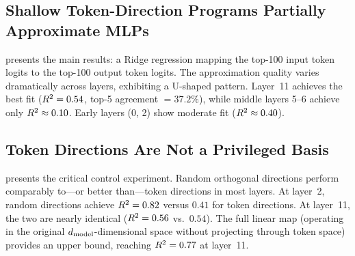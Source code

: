 \subsection{Shallow Token-Direction Programs Partially Approximate MLPs}
\label{sec:res_shallow}

 presents the main results: a Ridge regression mapping the top-100 input token logits to the top-100 output token logits.
The approximation quality varies dramatically across layers, exhibiting a U-shaped pattern.
Layer~11 achieves the best fit ($R^2 = 0.54$, top-5 agreement $= 37.2\%$), while middle layers 5--6 achieve only $R^2 \approx 0.10$.
Early layers (0, 2) show moderate fit ($R^2 \approx 0.40$).

\begin{table}[t]
    \centering
    \caption{Shallow program results ($k=100$). A Ridge regression maps top-100 input token logits to top-100 output token logits. The approximation shows a U-shaped pattern: best at early and late layers, worst at middle layers. Best $\Rsq$ in \textbf{bold}.}
    \label{tab:shallow}
\end{table}

\subsection{Token Directions Are Not a Privileged Basis}
\label{sec:res_baseline}

 presents the critical control experiment.
Random orthogonal directions perform comparably to---or better than---token directions in most layers.
At layer~2, random directions achieve $R^2 = 0.82$ versus $0.41$ for token directions.
At layer~11, the two are nearly identical ($R^2 = 0.56$ vs.\ $0.54$).
The full linear map (operating in the original $d_{\text{model}}$-dimensional space without projecting through token space) provides an upper bound, reaching $R^2 = 0.77$ at layer~11.

